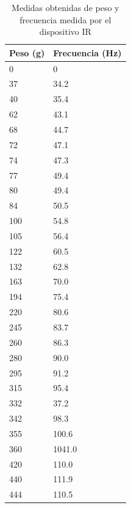 \documentclass[spanish,12pt,a4paper,titlepage]{report}
\begin{document}
\begin{table}[H]
\centering
\begin{tabular}{p{80pt}|p{80pt}} 
 \cellcolor[gray]{0.8} \textbf{Peso (g)} & \cellcolor[gray]{0.8} \textbf{Frecuencia (Hz)} \\ \hline
 
 0  & 0  \\ \hline
\cline{1-2}
37 & 34.2\\ \hline
\cline{1-2}
 40  & 35.4  \\ \hline
\cline{1-2}
62 & 43.1\\ \hline
\cline{1-2}
 68  & 44.7  \\ \hline
\cline{1-2}
72 & 47.1\\ \hline
\cline{1-2}
 74  & 47.3  \\ \hline
\cline{1-2}
77 & 49.4\\ \hline
\cline{1-2}
 80  & 49.4  \\ \hline
\cline{1-2}
84 & 50.5\\ \hline
\cline{1-2}
 100  & 54.8  \\ \hline
\cline{1-2}
105 & 56.4\\ \hline
\cline{1-2}
 122  & 60.5  \\ \hline
\cline{1-2}
132 & 62.8\\ \hline
\cline{1-2}
 163  & 70.0  \\ \hline
\cline{1-2}
194 & 75.4\\ \hline
\cline{1-2}
 220  & 80.6  \\ \hline
\cline{1-2}
245 & 83.7\\ \hline
\cline{1-2}
 260  & 86.3  \\ \hline
\cline{1-2}
280 & 90.0\\ \hline
\cline{1-2}
 295  & 91.2  \\ \hline
\cline{1-2}
315 & 95.4\\ \hline
\cline{1-2}
 332  & 37.2  \\ \hline
\cline{1-2}
342 & 98.3\\ \hline
\cline{1-2}
355 & 100.6\\ \hline
\cline{1-2}
 360  & 1041.0  \\ \hline
\cline{1-2}
420 & 110.0\\ \hline
\cline{1-2}
 440  & 111.9  \\ \hline
\cline{1-2}
444 & 110.5\\ \hline
\cline{1-2}
\end{tabular}
\caption{Medidas obtenidas de peso y frecuencia medida por el dispositivo IR}
\label{tab:fuerza-vel}
\end{table}
\end{document}
